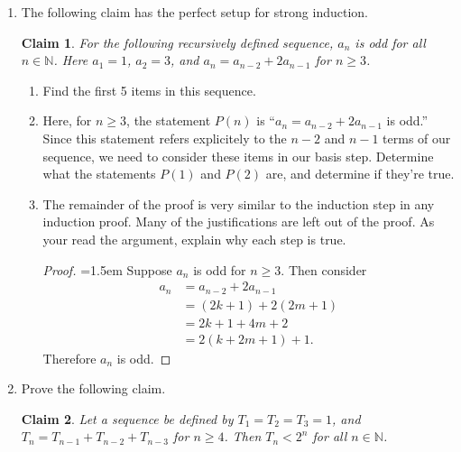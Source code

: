 \documentclass[12 pt]{article}
\newcommand{\N}{\mathbb{N}}
\theoremstyle{definition}
\theoremstyle{plain}
\theoremstyle{mytheorem}
\newtheorem{claim}{Claim}
\theoremstyle{myexample}
\theoremstyle{mydefinition}
\begin{document}
\begin{enumerate}
\item The following claim has the perfect setup for strong induction.
\begin{claim}  For the following recursively defined sequence, $a_n$ is odd for all $n \in \N$.  Here $a_1=1$, $a_2=3$, and $a_n=a_{n-2}+2a_{n-1}$ for $n \geq 3$.
\end{claim}
\begin{enumerate}
\item Find the first 5 items in this sequence.

\vspace{2in}

\item Here, for $n \geq 3$, the statement $P(n)$ is ``$a_n=a_{n-2}+2a_{n-1}$ is odd.''  Since this statement refers explicitely to the $n-2$ and $n-1$ terms of our sequence, we need to consider these items in our basis step.  Determine what the statements $P(1)$ and $P(2)$ are, and determine if they're true.

\vspace{2in}
\item The remainder of the proof is very similar to the induction step in any induction proof.  Many of the justifications are left out of the proof.  As your read the argument, explain why each step is true.

\begin{proof}  \openup=1.5em Suppose $a_n$ is odd for $n \geq 3$.  Then consider
\begin{align*}
a_n &= a_{n-2}+2a_{n-1}\\
\ &= (2k+1) + 2(2m+1) \\
\ &= 2k+1+4m+2 \\
\ &= 2(k+2m+1)+1.
\end{align*}
Therefore $a_n$ is odd.
\end{proof}

\end{enumerate}
\newpage
\item Prove the following claim.
\begin{claim}  Let a sequence be defined by $T_1=T_2=T_3=1$, and $T_n=T_{n-1}+T_{n-2}+T_{n-3}$ for $n\geq 4$.  Then $T_n<2^n$ for all $n \in \N$.
\end{claim}

\end{enumerate}
\end{document}
